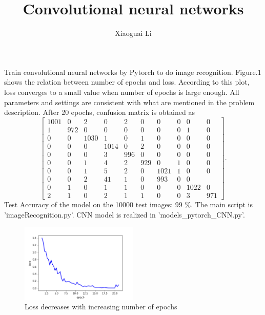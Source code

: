 \documentclass{article}
\title{Convolutional neural networks}
\author{Xiaoguai Li}
\date{}
\begin{document}
\maketitle


Train convolutional neural networks by Pytorch to do image recognition. Figure.1 shows the relation between number of epochs and loss. According to this plot, loss converges to a small value when number of epochs is large enough. All parameters and settings are consistent with what are mentioned in the problem description.  After 20 epochs, confusion matrix is obtained as 
\[
\begin{bmatrix}
1001  &  0 &   2   & 0   & 2    &0    &0   & 0   & 0 &   0\\
    1 & 972  &  0&    0&    0  &  0  &  0 &   0 &   1 &   0\\
   0  &  0& 1030   & 1   & 0   & 1  &  0  &  0   & 0  &  0\\
    0   & 0  &  0 &1014  &  0   & 2   & 0 &   0  &  0&    0\\
    0  &  0 &   0  &  3  &996 &   0  &  0   & 0 &   0 &   0\\
    0  &  0    &1  &  4    &2 & 929   & 0  &  1  &  0 &   0\\
    0    &0    &1  &  5    &2   & 0 &1021 &   1&    0 &   0\\
    0   & 0&    2&4    1 &   1  &  0  &993 &   0  &  0\\
    0    &1  &  0   & 1 &   1  &  0 &   0 &   0& 1022  &  0\\
    2    &1&    0  &  2 &   1 &   1  &  0 &   0  &  3  &971
\end{bmatrix}. 
\]
Test Accuracy of the model on the 10000 test images: 99 \%.
The main script is 'imageRecognition.py'. CNN model is realized in 'models\_pytorch\_CNN.py'.

\begin{figure}[h]
    \center
    \includegraphics[width=0.5\textwidth]{loss2}
    \caption{Loss decreases with increasing number of epochs}
\end{figure}
\end{document}
